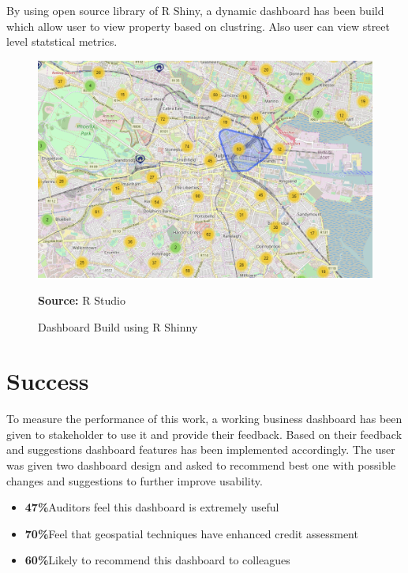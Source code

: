 By using open source library of R Shiny, a dynamic dashboard has been build which allow user to view property based on clustring. Also user can view street level statstical metrics.

\begin{center}
\begin{figure}[!htb]
\includegraphics[width=\textwidth]{rmap.png}
\centering
\caption{Dashboard Build using R Shinny}{\textbf{Source:} R Studio}
\label{fig:rmap}
\end{figure}
\end{center}



\section{Success}\label{S.succes}
To measure the performance of this work, a working business dashboard has been given to stakeholder to use it and provide their feedback. Based on their feedback and suggestions dashboard features has been implemented accordingly. The user was given two dashboard design and asked to recommend best one with possible changes and suggestions to further improve usability.

\begin{itemize}
\item \textbf{47\%}Auditors feel this dashboard is extremely useful
\item \textbf{70\%}Feel that geospatial techniques have enhanced credit assessment
\item \textbf{60\%}Likely to recommend this dashboard to colleagues
\end{itemize}